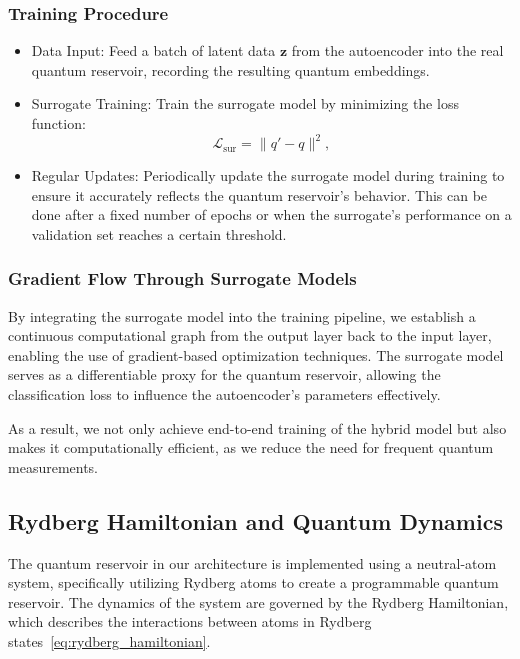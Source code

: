 \documentclass[conference]{IEEEtran}
\begin{document}
\subsubsection{Training Procedure}
\begin{itemize}
    \item Data Input: 
    Feed a batch of latent data \( \mathbf{z} \) from the autoencoder 
    into the real quantum reservoir, recording the resulting quantum 
    embeddings.

    \item Surrogate Training:
    Train the surrogate model  by minimizing the loss function:
    \begin{equation}
        \mathcal{L}_{\text{sur}} = \| q' - q \|^2,
    \end{equation}

    
    \item Regular Updates:
    Periodically update the surrogate model during training
    to ensure it accurately reflects the quantum reservoir's
    behavior. This can be done after a fixed number of epochs
    or when the surrogate's performance on a validation set
    reaches a certain threshold.
\end{itemize}

\subsubsection{Gradient Flow Through Surrogate Models}
By integrating the surrogate model into the training pipeline, 
we establish a continuous computational graph from the 
output layer back to the input layer, enabling the use of 
gradient-based optimization techniques. The surrogate model 
serves as a differentiable proxy for the quantum reservoir, 
allowing the classification loss to influence the 
autoencoder's parameters effectively.

As a result, we not only achieve end-to-end training of the
hybrid model but also makes it computationally efficient,
as we reduce the need for frequent quantum measurements.

\subsection{Rydberg Hamiltonian and Quantum Dynamics}
The quantum reservoir in our architecture is implemented
using a neutral-atom system, specifically utilizing
Rydberg atoms to create a programmable quantum reservoir.
The dynamics of the system are governed by the Rydberg Hamiltonian,
which describes the interactions between atoms in Rydberg states~\ref{eq:rydberg_hamiltonian}.
\end{document}
